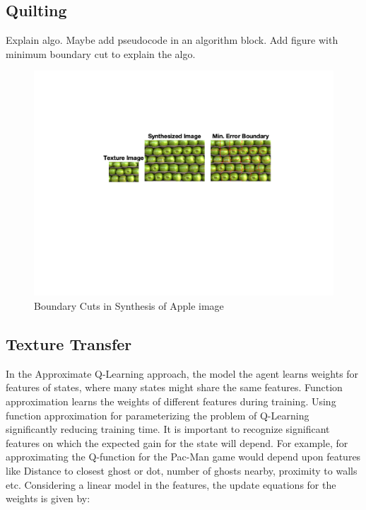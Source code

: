 \documentclass[10pt,twocolumn,letterpaper]{article}
\begin{document}
\subsection{Quilting}
Explain algo. Maybe add pseudocode in an algorithm block. Add figure with minimum boundary cut to explain the algo.
\begin{figure}[h]
\begin{center}
\includegraphics[trim={9cm 15cm 2cm 8cm},clip, scale=0.38]{resources/apple_boundary_example.png}
\end{center}
\vspace{-0.2em}
\caption{Boundary Cuts in Synthesis of Apple image}
\label{fig:bcut_example}
\end{figure}
\subsection{Texture Transfer}

In the Approximate Q-Learning approach, the model the agent learns weights for features of states, where many states might share the same features. Function approximation learns the weights of different features during training. Using function approximation for parameterizing the problem of Q-Learning significantly reducing training time. It is important to recognize significant features on which the expected gain for the state will depend. For example, for approximating the Q-function for the Pac-Man game would depend upon features like Distance to closest ghost or dot, number of ghosts nearby, proximity to walls etc. Considering a linear model in the features, the update equations for the weights is given by:
\end{document}
